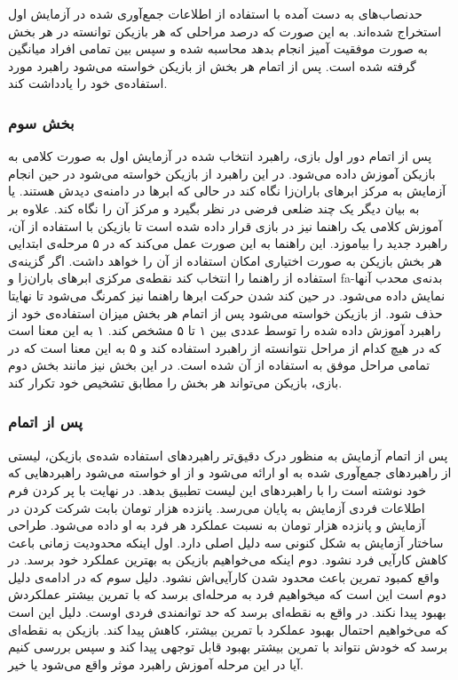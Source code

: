 \documentclass[twoside, a4paper,11pt]{book}
\numberwithin{equation}{chapter}
\numberwithin{table}{chapter}
\numberwithin{figure}{chapter}
\numberwithin{equation}{chapter}
\newcommand{\mls}[1]{\gls{fa-#1}\glsuseri{la-#1}}
\begin{document}
حدنصاب‌های به دست آمده با استفاده از اطلاعات جمع‌آوری شده در آزمایش اول استخراج شده‌اند. به این صورت که درصد مراحلی که هر بازیکن توانسته در هر بخش به صورت موفقیت آمیز انجام بدهد محاسبه شده و سپس بین تمامی افراد میانگین گرفته شده است. پس از اتمام هر بخش از بازیکن خواسته می‌شود راهبرد مورد استفاده‌ی خود را یادداشت کند.

\subsubsection{بخش سوم} \label{partTwoMainTest:three}

پس از اتمام دور اول بازی، راهبرد انتخاب شده در آزمایش اول به صورت کلامی به بازیکن آموزش داده می‌شود. در این راهبرد از بازیکن خواسته می‌شود در حین انجام آزمایش به مرکز ابرهای باران‌زا نگاه کند در حالی که ابرها در دامنه‌ی دیدش هستند. یا به بیان دیگر یک چند ضلعی فرضی در نظر بگیرد و مرکز آن را نگاه کند. علاوه بر آموزش کلامی یک راهنما نیز در بازی قرار داده شده است تا بازیکن با استفاده از آن، راهبرد جدید را بیاموزد. این راهنما به این صورت عمل می‌کند که در ۵ مرحله‌ی ابتدایی هر بخش بازیکن به صورت اختیاری امکان استفاده از آن را خواهد داشت. اگر گزینه‌ی استفاده از راهنما را انتخاب کند نقطه‌ی مرکزی ابرهای باران‌زا و \mls{بدنه‌ی محدب} آنها نمایش داده می‌شود. در حین کند شدن حرکت ابرها راهنما نیز کمرنگ می‌شود تا نهایتا حذف شود. از بازیکن خواسته می‌شود پس از اتمام هر بخش میزان استفاده‌ی خود از راهبرد آموزش داده شده را توسط عددی بین ۱ تا ۵ مشخص کند. ۱ به این معنا است که در هیچ کدام از مراحل نتوانسته از راهبرد استفاده کند و ۵ به این معنا است که در تمامی مراحل موفق به استفاده از آن شده است. در این بخش نیز مانند بخش دوم بازی، بازیکن می‌تواند هر بخش را مطابق تشخیص خود تکرار کند.

\subsubsection{پس از اتمام}

پس از اتمام آزمایش به منظور درک دقیق‌تر راهبردهای استفاده شده‌ی بازیکن، لیستی از راهبردهای جمع‌آوری شده به او ارائه می‌شود و از او خواسته می‌شود راهبردهایی که خود نوشته است را با راهبردهای این لیست تطبیق بدهد. در نهایت با پر کردن فرم اطلاعات فردی آزمایش به پایان می‌رسد. پانزده هزار تومان بابت شرکت کردن در آزمایش و پانزده هزار تومان به نسبت عملکرد هر فرد به او داده می‌شود.
طراحی ساختار آزمایش به شکل کنونی سه دلیل اصلی دارد. اول اینکه محدودیت زمانی باعث کاهش کارآیی فرد نشود. دوم اینکه می‌خواهیم بازیکن به بهترین عملکرد خود برسد. در واقع کمبود تمرین باعث محدود شدن کارآیی‌اش نشود. دلیل سوم که در ادامه‌ی دلیل دوم است این است که میخواهیم فرد به مرحله‌ای برسد که با تمرین بیشتر عملکردش بهبود پیدا نکند. در واقع به نقطه‌ای برسد که حد توانمندی فردی اوست. دلیل این است که می‌خواهیم احتمال بهبود عملکرد با تمرین بیشتر، کاهش پیدا کند. بازیکن به نقطه‌ای برسد که خودش نتواند با تمرین بیشتر بهبود قابل توجهی پیدا کند و سپس بررسی کنیم آیا در این مرحله آموزش راهبرد موثر واقع می‌شود یا خیر.
\end{document}
